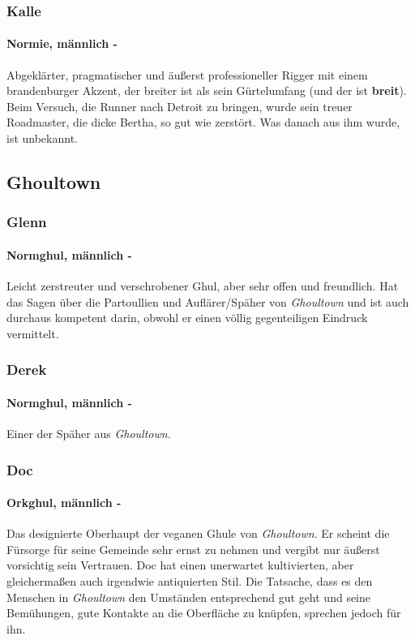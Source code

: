     \subsubsection{Kalle}
    \paragraph{Normie, männlich -} Abgeklärter, pragmatischer und äußerst professioneller Rigger mit einem brandenburger Akzent, der breiter ist als sein Gürtelumfang (und der ist \textbf{breit}). Beim Versuch, die Runner nach Detroit zu bringen, wurde sein treuer Roadmaster, die dicke Bertha, so gut wie zerstört. Was danach aus ihm wurde, ist unbekannt.


\subsection{Ghoultown}

    \subsubsection{Glenn}
    \paragraph{Normghul, männlich -} Leicht zerstreuter und verschrobener Ghul, aber sehr offen und freundlich. Hat das Sagen über die Partoullien und Auflärer/Späher von \textit{Ghoultown} und ist auch durchaus kompetent darin, obwohl er einen völlig gegenteiligen Eindruck vermittelt.
    
    \subsubsection{Derek}
    \paragraph{Normghul, männlich -} Einer der Späher aus \textit{Ghoultown}.
    
    \subsubsection{Doc}
    \paragraph{Orkghul, männlich -} Das designierte Oberhaupt der veganen Ghule von \textit{Ghoultown}. Er scheint die Fürsorge für seine Gemeinde sehr ernst zu nehmen und vergibt nur äußerst vorsichtig sein Vertrauen. Doc hat einen unerwartet kultivierten, aber gleichermaßen auch irgendwie antiquierten Stil. Die Tatsache, dass es den Menschen in \textit{Ghoultown} den Umständen entsprechend gut geht und seine Bemühungen, gute Kontakte an die Oberfläche zu knüpfen, sprechen jedoch für ihn.
    
